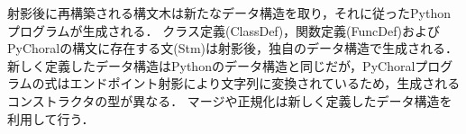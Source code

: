 \documentclass{thesis}
\begin{document}
%
%
%
射影後に再構築される構文木は新たなデータ構造を取り，それに従ったPythonプログラムが生成される．
クラス定義(\textsf{ClassDef})，関数定義(\textsf{FuncDef})およびPyChoralの構文に存在する文(\textsf{Stm})は射影後，独自のデータ構造で生成される．
新しく定義したデータ構造はPythonのデータ構造と同じだが，PyChoralプログラムの式はエンドポイント射影により文字列に変換されているため，生成されるコンストラクタの型が異なる．
マージや正規化は新しく定義したデータ構造を利用して行う．
\end{document}
